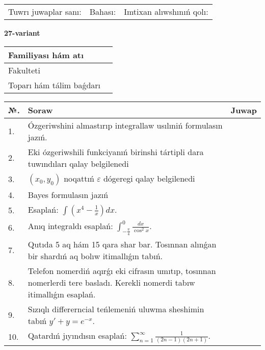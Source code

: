 \documentclass{article}
\begin{document}
\vspace{1cm}

\begin{tabular}{ c c c }
Tuwrı juwaplar sanı: \underline{\hspace{2cm}} & Bahası: \underline{\hspace{2cm}} & Imtixan alıwshınıń qolı: \underline{\hspace{2cm}} \\
\end{tabular}

\newpage

\begin{center}\textbf{27-variant}\end{center}

\bgroup
\def\arraystretch{1.5}
\begin{tabular}{ |m{6cm}|m{10cm}| }
  \hline
  Familiyası hám atı & \\
  \hline
  Fakulteti &\\
  \hline
  Toparı hám tálim baǵdarı & \\
  \hline
\end{tabular}
\egroup

\vspace{0.5cm}

\bgroup
\def\arraystretch{2}
\begin{tabular}{ |l|m{8cm}|m{7cm}| }
  \hline
  №. & Soraw & Juwap \\
  \hline
  1. & Ózgeriwshini almastırıp integrallaw usılıniń formulasın jazıń. &  \\
  \hline
  2. & Eki ózgeriwshili funkciyanıń birinshi tártipli dara tuwındıları qalay belgilenedi &  \\
  \hline
  3. & $(x_{0} , y_{0})$ noqattıń $\varepsilon$ dógeregi qalay belgilenedi &  \\
  \hline
  4. & Bayes formulasın jazıń &  \\
  \hline
  5. & Esaplań: $\displaystyle\int \left( x^{4}-\frac{1}{x} \right)dx$. &  \\
  \hline
  6. & Anıq integraldı esaplań: $\displaystyle\int_{-\frac{\pi}{4}}^{0}\frac{dx}{\cos^{2}x}$. &  \\
  \hline
  7. & Qutıda 5 aq hám 15 qara shar bar. Tosınnan alınǵan bir shardıń aq bolıw itimallıǵın tabıń. &  \\
  \hline
  8. & Telefon nomerdiń aqırǵı eki cifrasın umıtıp, tosınnan nomerlerdi tere basladı. Kerekli nomerdi tabıw itimallıǵın esaplań. &  \\
  \hline
  9. & Sızıqlı differerncial teńlemeniń uluwma sheshimin tabıń $y' + y =e^{-x}$. &  \\
  \hline
  10. & Qatardıń jıyındısın esaplań: $\displaystyle\sum_{n = 1}^{\infty}\frac{1}{(2n - 1)(2n + 1)}$. &  \\
  \hline
\end{tabular}
\egroup
\end{document}
